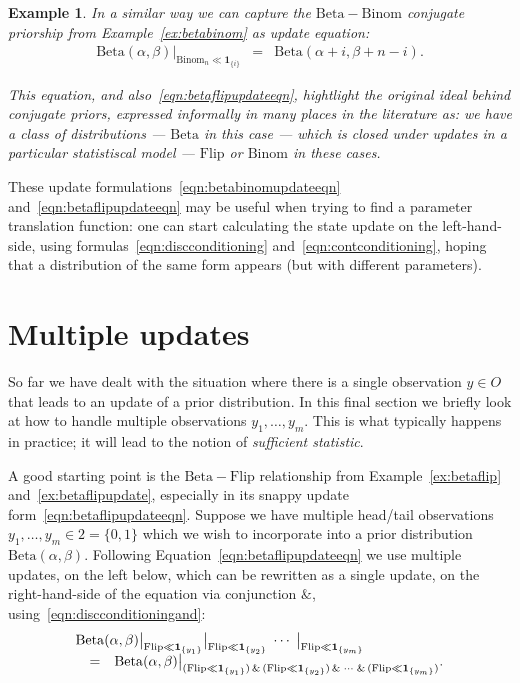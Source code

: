 \documentclass{mscs}
\newcommand{\andthen}{\ensuremath{\mathrel{\&}}}
\newcommand{\indic}[1]{\mathbf{1}_{#1}}
\newcommand{\betachan}{\ensuremath{\mathrm{Beta}}}
\newcommand{\flipchan}{\ensuremath{\mathrm{Flip}}}
\newcommand{\binomchan}{\ensuremath{\mathrm{Binom}}}
\newtheorem{example}[theorem]{Example}
\begin{document}
\begin{example}
In a similar way we can capture the $\betachan - \binomchan$ conjugate
priorship from Example~\ref{ex:betabinom} as update equation:
\begin{equation}
\label{eqn:betabinomupdateeqn}
\begin{array}{rcl}
\betachan(\alpha,\beta)\big|_{\binomchan_{n} \ll \indic{\{i\}}}
& = &
\betachan(\alpha+i, \beta+n-i).
\end{array}
\end{equation}

\noindent This equation, and also~\eqref{eqn:betaflipupdateeqn},
hightlight the original ideal behind conjugate priors, expressed
informally in many places in the literature as: we have a class of
distributions --- $\betachan$ in this case --- which is closed under
updates in a particular statistiscal model --- $\flipchan$ or
$\binomchan$ in these cases.
\end{example}


These update formulations~\eqref{eqn:betabinomupdateeqn}
and~\eqref{eqn:betaflipupdateeqn} may be useful when trying to find a
parameter translation function: one can start calculating the state
update on the left-hand-side, using
formulas~\eqref{eqn:discconditioning}
and~\eqref{eqn:contconditioning}, hoping that a distribution of the
same form appears (but with different parameters).


\section{Multiple updates}\label{sec:multiple}

So far we have dealt with the situation where there is a single
observation $y\in O$ that leads to an update of a prior
distribution. In this final section we briefly look at how to handle
multiple observations $y_{1}, \ldots, y_{m}$. This is what typically
happens in practice; it will lead to the notion of \emph{sufficient
  statistic}.

A good starting point is the $\betachan - \flipchan$ relationship from
Example~\ref{ex:betaflip} and~\ref{ex:betaflipupdate}, especially in
its snappy update form~\eqref{eqn:betaflipupdateeqn}. Suppose we have
multiple head/tail observations $y_{1}, \ldots, y_{m} \in 2 = \{0,1\}$
which we wish to incorporate into a prior distribution
$\betachan(\alpha,\beta)$. Following
Equation~\eqref{eqn:betaflipupdateeqn} we use multiple updates, on the
left below, which can be rewritten as a single update, on the
right-hand-side of the equation via conjunction $\andthen$,
using~\eqref{eqn:discconditioningand}:
\[ \begin{array}{rcl}
\lefteqn{\betachan(\alpha,\beta)\big|_{\flipchan \ll \indic{\{y_1\}}} 
  \big|_{\flipchan \ll \indic{\{y_2\}}} \;\cdots\; \big|_{\flipchan \ll \indic{\{y_m\}}}}
\\
& = &
\betachan(\alpha,\beta)\big|_{(\flipchan \ll \indic{\{y_1\}}) \,\andthen\,
  (\flipchan \ll \indic{\{y_2\}}) \,\andthen\; \cdots \;\andthen\,
  (\flipchan \ll \indic{\{y_m\}})}.
\end{array} \]
\end{document}
